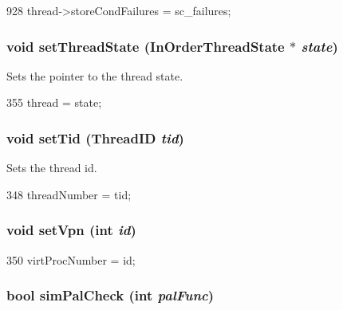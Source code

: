 \begin{DoxyCode}
928     { thread->storeCondFailures = sc_failures; }
\end{DoxyCode}
\hypertarget{classInOrderDynInst_aea755013a6e0d4b31968c7b95ae24750}{
\subsubsection[{setThreadState}]{\setlength{\rightskip}{0pt plus 5cm}void setThreadState ({\bf InOrderThreadState} $\ast$ {\em state})}}
\label{classInOrderDynInst_aea755013a6e0d4b31968c7b95ae24750}
Sets the pointer to the thread state. 


\begin{DoxyCode}
355 { thread = state; }
\end{DoxyCode}
\hypertarget{classInOrderDynInst_ad1c2ae5b668e7024fd2b0f956aefaa4e}{
\subsubsection[{setTid}]{\setlength{\rightskip}{0pt plus 5cm}void setTid ({\bf ThreadID} {\em tid})}}
\label{classInOrderDynInst_ad1c2ae5b668e7024fd2b0f956aefaa4e}
Sets the thread id. 


\begin{DoxyCode}
348 { threadNumber = tid; }
\end{DoxyCode}
\hypertarget{classInOrderDynInst_a4cd838b59165907871b7de050d39e560}{
\subsubsection[{setVpn}]{\setlength{\rightskip}{0pt plus 5cm}void setVpn (int {\em id})}}
\label{classInOrderDynInst_a4cd838b59165907871b7de050d39e560}



\begin{DoxyCode}
350 { virtProcNumber = id; }
\end{DoxyCode}
\hypertarget{classInOrderDynInst_a461205960be9d52e9beda48a77e9c600}{
\subsubsection[{simPalCheck}]{\setlength{\rightskip}{0pt plus 5cm}bool simPalCheck (int {\em palFunc})}}
\label{classInOrderDynInst_a461205960be9d52e9beda48a77e9c600}



